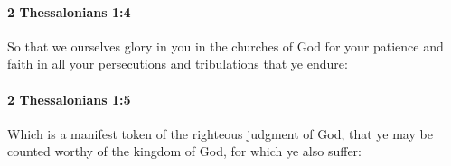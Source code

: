 		\paragraph{2 Thessalonians 1:4} %
			\label{2THESSALONIANS-1-4}

			So that we ourselves glory in you in the churches of God for your patience and faith in all your persecutions and tribulations that ye endure:

			\begin{framed}
			\scriptsize
				\begin{compactdesc}
					\item[SBLG] 
				\end{compactdesc}
			\end{framed}

		\paragraph{2 Thessalonians 1:5} %
			\label{2THESSALONIANS-1-5}

			Which is a manifest token of the righteous judgment of God, that ye may be counted worthy of the kingdom of God, for which ye also suffer:

